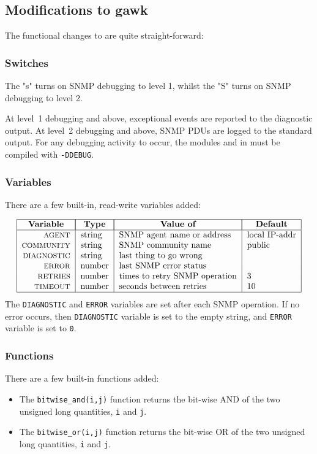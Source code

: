 \subsection*	{Modifications to gawk}
The functional changes to  are quite straight-forward:

\subsubsection*	{Switches}
The \switch"s" turns on SNMP debugging to level 1,
whilst the \switch"S" turns on SNMP debugging to level 2.

At level~1 debugging and above,
exceptional events are reported to the diagnostic output.
At level~2 debugging and above,
SNMP PDUs are logged to the standard output.
For any debugging activity to occur,
the modules  and  in  must be compiled
with \verb"-DDEBUG".

\subsubsection*	{Variables}
There are a few built-in, read-write variables added:
\begin{small}
\[\begin{tabular}{|r|l|l|l|}
\hline
\multicolumn{1}{|c|}{\bf Variable}&
		\multicolumn{1}{|c|}{\bf Type}&
			\multicolumn{1}{|c|}{\bf Value of}&
					\multicolumn{1}{|c|}{\bf Default}\\
\hline
\smaller AGENT&		string&	SNMP agent name or address&	local IP-addr\\
\smaller COMMUNITY&	string&	SNMP community name&		public\\
\smaller DIAGNOSTIC&	string&	last thing to go wrong&		\\
\smaller ERROR&		number&	last SNMP error status&		\\
\smaller RETRIES&	number&	times to retry SNMP operation&	3\\
\smaller TIMEOUT&	number&	seconds between retries&	10\\
\hline
\end{tabular}\]\normalsize
The \verb"DIAGNOSTIC" and \verb"ERROR" variables are set after each SNMP
operation.
If no error occurs,
then \verb"DIAGNOSTIC" variable is set to the empty string,
and \verb"ERROR" variable is set to \verb"0".
\end{small}

\subsubsection*	{Functions}
There are a few built-in functions added:
\begin{itemize}
\item	The \verb"bitwise_and(i,j)" function returns the bit-wise AND of the
	two unsigned long quantities, \verb"i" and \verb"j".

\item	The \verb"bitwise_or(i,j)" function returns the bit-wise OR of the
	two unsigned long quantities, \verb"i" and \verb"j".
\end{itemize}

